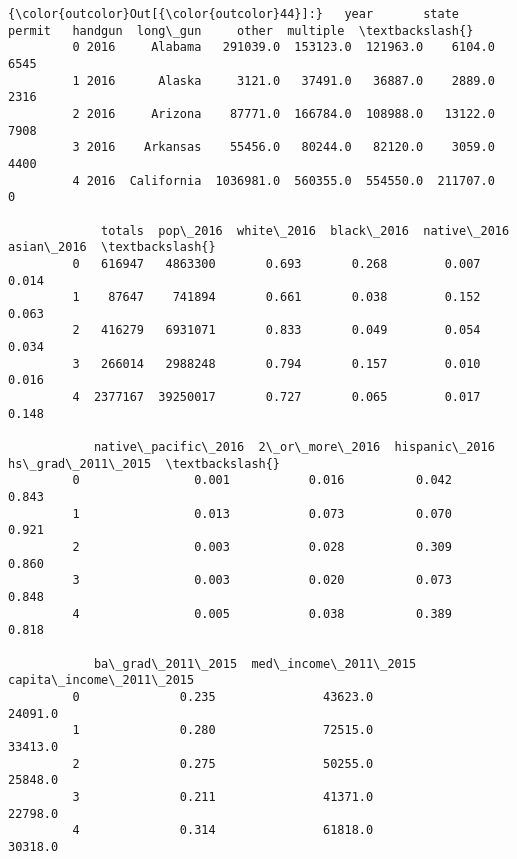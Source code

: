 \documentclass[11pt]{article}
\begin{document}
\begin{Verbatim}[commandchars=\\\{\}]
{\color{outcolor}Out[{\color{outcolor}44}]:}   year       state     permit   handgun  long\_gun     other  multiple  \textbackslash{}
         0 2016     Alabama   291039.0  153123.0  121963.0    6104.0      6545   
         1 2016      Alaska     3121.0   37491.0   36887.0    2889.0      2316   
         2 2016     Arizona    87771.0  166784.0  108988.0   13122.0      7908   
         3 2016    Arkansas    55456.0   80244.0   82120.0    3059.0      4400   
         4 2016  California  1036981.0  560355.0  554550.0  211707.0         0   
         
             totals  pop\_2016  white\_2016  black\_2016  native\_2016  asian\_2016  \textbackslash{}
         0   616947   4863300       0.693       0.268        0.007       0.014   
         1    87647    741894       0.661       0.038        0.152       0.063   
         2   416279   6931071       0.833       0.049        0.054       0.034   
         3   266014   2988248       0.794       0.157        0.010       0.016   
         4  2377167  39250017       0.727       0.065        0.017       0.148   
         
            native\_pacific\_2016  2\_or\_more\_2016  hispanic\_2016  hs\_grad\_2011\_2015  \textbackslash{}
         0                0.001           0.016          0.042              0.843   
         1                0.013           0.073          0.070              0.921   
         2                0.003           0.028          0.309              0.860   
         3                0.003           0.020          0.073              0.848   
         4                0.005           0.038          0.389              0.818   
         
            ba\_grad\_2011\_2015  med\_income\_2011\_2015  capita\_income\_2011\_2015  
         0              0.235               43623.0                  24091.0  
         1              0.280               72515.0                  33413.0  
         2              0.275               50255.0                  25848.0  
         3              0.211               41371.0                  22798.0  
         4              0.314               61818.0                  30318.0  
\end{Verbatim}
            
\end{document}
